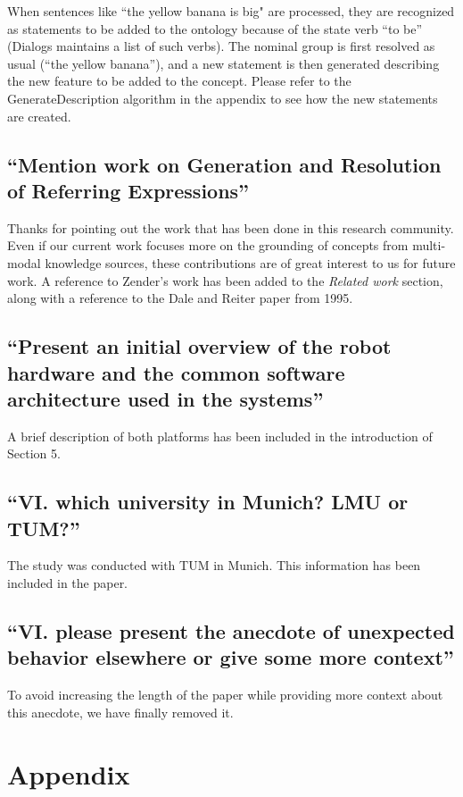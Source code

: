 \documentclass[11pt]{article}
\begin{document}
When sentences like ``the yellow banana is big" are processed, they are
recognized as statements to be added to the ontology because of the state verb ``to be''
({\sc Dialogs} maintains a list of such verbs). The nominal group is first resolved as usual (``the yellow banana''), and a new statement is then generated describing the new feature to be added to the concept. Please refer to the {\sc GenerateDescription} algorithm in the appendix to see how the
new statements are created.

\subsection{``Mention work on Generation and Resolution of Referring Expressions''}

Thanks for pointing out the work that has been done in this research community.
Even if our current work focuses more on the grounding of concepts from 
multi-modal knowledge sources, these contributions are of great interest to us for future work.
A reference to Zender's work has been added to the \emph{Related work} 
section, along with a reference to the Dale and Reiter paper from 1995.

\subsection{``Present an initial overview of the
robot hardware and the common software architecture used in the systems''}

A brief description of both platforms has been included in the introduction of Section 5.

\subsection{``VI. which university in Munich? LMU or TUM?''}

The study was conducted with TUM in Munich. This information has been included in the paper.

\subsection{``VI. please present the anecdote of unexpected behavior elsewhere
or give some more context''}

To avoid increasing the length of the paper while providing more context about this anecdote, we have finally removed it.

\section{Appendix}
\end{document}
